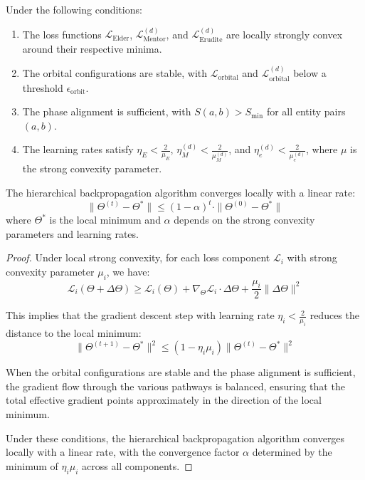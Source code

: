 \begin{theorem}
Under the following conditions:
\begin{enumerate}
    \item The loss functions $\mathcal{L}_{\text{Elder}}$, $\mathcal{L}_{\text{Mentor}}^{(d)}$, and $\mathcal{L}_{\text{Erudite}}^{(d)}$ are locally strongly convex around their respective minima.
    \item The orbital configurations are stable, with $\mathcal{L}_{\text{orbital}}$ and $\mathcal{L}_{\text{orbital}}^{(d)}$ below a threshold $\epsilon_{\text{orbit}}$.
    \item The phase alignment is sufficient, with $S(a, b) > S_{\text{min}}$ for all entity pairs $(a, b)$.
    \item The learning rates satisfy $\eta_E < \frac{2}{\mu_E}$, $\eta_M^{(d)} < \frac{2}{\mu_M^{(d)}}$, and $\eta_e^{(d)} < \frac{2}{\mu_e^{(d)}}$, where $\mu$ is the strong convexity parameter.
\end{enumerate}

The hierarchical backpropagation algorithm converges locally with a linear rate:
\begin{equation}
\|\Theta^{(t)} - \Theta^*\| \leq (1 - \alpha)^t \cdot \|\Theta^{(0)} - \Theta^*\|
\end{equation}
where $\Theta^*$ is the local minimum and $\alpha$ depends on the strong convexity parameters and learning rates.
\end{theorem}

\begin{proof}
Under local strong convexity, for each loss component $\mathcal{L}_i$ with strong convexity parameter $\mu_i$, we have:
\begin{equation}
\mathcal{L}_i(\Theta + \Delta\Theta) \geq \mathcal{L}_i(\Theta) + \nabla_{\Theta} \mathcal{L}_i \cdot \Delta\Theta + \frac{\mu_i}{2} \|\Delta\Theta\|^2
\end{equation}

This implies that the gradient descent step with learning rate $\eta_i < \frac{2}{\mu_i}$ reduces the distance to the local minimum:
\begin{equation}
\|\Theta^{(t+1)} - \Theta^*\|^2 \leq (1 - \eta_i \mu_i) \|\Theta^{(t)} - \Theta^*\|^2
\end{equation}

When the orbital configurations are stable and the phase alignment is sufficient, the gradient flow through the various pathways is balanced, ensuring that the total effective gradient points approximately in the direction of the local minimum.

Under these conditions, the hierarchical backpropagation algorithm converges locally with a linear rate, with the convergence factor $\alpha$ determined by the minimum of $\eta_i \mu_i$ across all components.
\end{proof}

